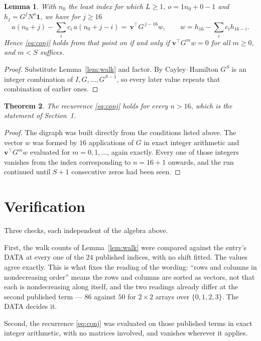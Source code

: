 \documentclass[11pt,a4paper]{article}
\theoremstyle{plain}
\newtheorem{theorem}{Theorem}
\newtheorem{lemma}[theorem]{Lemma}
\theoremstyle{definition}
\begin{document}
\begin{lemma}\label{lem:crit}
With $n_0$ the least index for which $L\ge1$, $o=1n_0+0-1$ and
$h_j=G^{j}N^{o}\mathbf{1}$, we have for $j\ge16$
\[
a(n_0+j)-\sum_i c_i\,a(n_0+j-i)=\,\mathbf{v}^{\!\top}G^{\,j-16}w,
\qquad w=h_{16}-\sum_i c_ih_{16-i} .
\]
Hence \eqref{eq:conj} holds from that point on if and only if
$\mathbf{v}^{\!\top}G^{m}w=0$ for all $m\ge0$, and $m<S$ suffices.
\end{lemma}

\begin{proof}
Substitute Lemma~\ref{lem:walk} and factor. By Cayley--Hamilton $G^{S}$ is an integer
combination of $I,G,\dots,G^{S-1}$, so every later value repeats that combination of
earlier ones.
\end{proof}

\begin{theorem}
The recurrence \eqref{eq:conj} holds for every $n>16$, which is the statement of
Section~1.
\end{theorem}

\begin{proof}
The digraph was built directly from the conditions listed above. The vector $w$ was formed by
$16$ applications of $G$ in exact integer arithmetic and $\mathbf{v}^{\!\top}G^{m}w$
evaluated for $m=0,1,\dots$, again exactly. Every one of those integers vanishes from the
index corresponding to $n=16+1$ onwards, and the run continued until $S+1$ consecutive
zeros had been seen.
\end{proof}

\section{Verification}

Three checks, each independent of the algebra above.

First, the walk counts of Lemma~\ref{lem:walk} were compared against the entry's DATA at
every one of the $24$ published indices, with no shift fitted. The values agree exactly.
This is what fixes the reading of the wording: ``rows and columns in nondecreasing order''
means the rows and columns are sorted as vectors, not that each is nondecreasing along
itself, and the two readings already differ at the second published term --- $86$ against
$50$ for $2\times2$ arrays over $\{0,1,2,3\}$. The DATA decides it.

Second, the recurrence \eqref{eq:conj} was evaluated on those published terms in exact
integer arithmetic, with no matrices involved, and vanishes wherever it applies.
\end{document}
